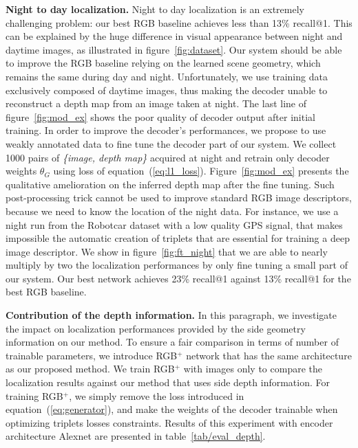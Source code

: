 \vspace{4pt}\noindent\textbf{Night to day localization.} Night to day localization is an extremely challenging problem: our best RGB baseline achieves less than 13\% recall@1. This can be explained by the huge difference in visual appearance between night and daytime images, as illustrated in figure~\ref{fig:dataset}. Our system should be able to improve the RGB baseline relying on the learned scene geometry, which remains the same during day and night. Unfortunately, we use training data exclusively composed of daytime images, thus making the decoder unable to reconstruct a depth map from an image taken at night. The last line of figure~\ref{fig:mod_ex} shows the poor quality of decoder output after initial training. In order to improve the decoder's performances, we propose to use weakly annotated data to fine tune the decoder part of our system. We collect 1000 pairs of \textit{\{image, depth map\}} acquired at night and retrain only decoder weights $\theta_G$ using loss of equation~(\ref{eq:l1_loss}). Figure~\ref{fig:mod_ex} presents the qualitative amelioration on the inferred depth map after the fine tuning. Such post-processing trick cannot be used to improve standard RGB image descriptors, because we need to know the location of the night data. For instance, we use a night run from the Robotcar dataset with a low quality GPS signal, that makes impossible the automatic creation of triplets that are essential for training a deep image descriptor. We show in figure~\ref{fig:ft_night} that we are able to nearly multiply by two the localization performances by only fine tuning a small part of our system. Our best network achieves 23\% recall@1 against 13\% recall@1 for the best RGB baseline.

\vspace{4pt}\noindent\textbf{Contribution of the depth information.} In this paragraph, we investigate the impact on localization performances provided by the side geometry information on our method. To ensure a fair comparison in terms of number of trainable parameters, we introduce RGB$^+$ network that has the same architecture as our proposed method. We train RGB$^+$ with images only to compare the localization results against our method that uses side depth information. For training RGB$^+$, we simply remove the loss introduced in equation~(\ref{eq:generator}), and make the weights of the decoder trainable when optimizing triplets losses constraints. Results of this experiment with encoder architecture Alexnet are presented in table~\ref{tab/eval_depth}.

